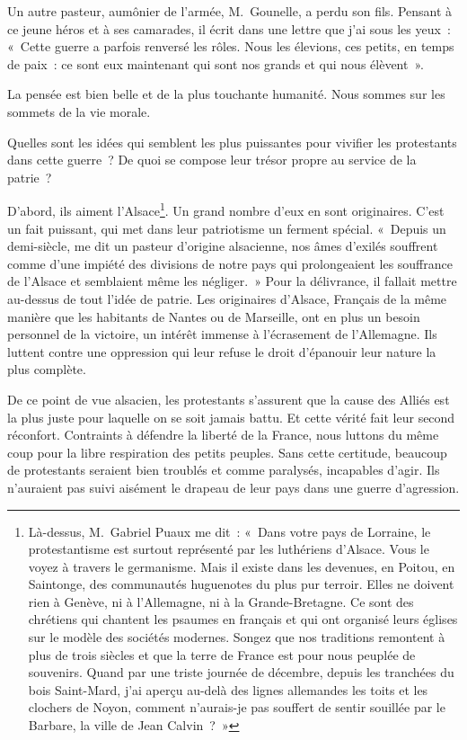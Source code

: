 \documentclass[french,twoside]{book} %
\begin{document}
Un autre pasteur, aumônier de l’armée, M. Gounelle, a perdu son fils. Pensant à ce jeune héros et à ses camarades, il écrit dans une lettre que j’ai sous les yeux : « Cette guerre a parfois renversé les rôles. Nous les élevions, ces petits, en temps de paix : ce sont eux maintenant qui sont nos grands et qui nous élèvent ».‌\par
La pensée est bien belle et de la plus touchante humanité. Nous sommes sur les sommets de la vie morale.‌\par
Quelles sont les idées qui semblent les plus puissantes pour vivifier les protestants dans cette guerre ? De quoi se compose leur trésor propre au service de la patrie ?‌\par
D’abord, ils aiment l’Alsace\footnote{ \par
 Là-dessus, M. Gabriel Puaux me dit : « Dans votre pays de Lorraine, le protestantisme est surtout représenté par les luthériens d’Alsace. Vous le voyez à travers le germanisme. Mais il existe dans les devenues, en Poitou, en Saintonge, des communautés huguenotes du plus pur terroir. Elles ne doivent rien à Genève, ni à l’Allemagne, ni à la Grande-Bretagne. Ce sont des chrétiens qui chantent les psaumes en français et qui ont organisé leurs églises sur le modèle des sociétés modernes. Songez que nos traditions remontent à plus de trois siècles et que la terre de France est pour nous peuplée de souvenirs. Quand par une triste journée de décembre, depuis les tranchées du bois Saint-Mard, j’ai aperçu au-delà des lignes allemandes les toits et les clochers de Noyon, comment n’aurais-je pas souffert de sentir souillée par le Barbare, la ville de Jean Calvin ? »
 }. Un grand nombre d’eux en sont originaires. C’est un fait puissant, qui met dans leur patriotisme un ferment spécial. « Depuis un demi-siècle, me dit un pasteur d’origine alsacienne, nos âmes d’exilés souffrent comme d’une impiété des divisions de notre pays qui prolongeaient les souffrance de l’Alsace et semblaient même les négliger. » Pour la délivrance, il fallait mettre au-dessus de tout l’idée de patrie. Les originaires d’Alsace, Français de la même manière que les habitants de Nantes ou de Marseille, ont en plus un besoin personnel de la victoire, un intérêt immense à l’écrasement de l’Allemagne. Ils luttent contre une oppression qui leur refuse le droit d’épanouir leur nature la plus complète.‌\par
De ce point de vue alsacien, les protestants s’assurent que la cause des Alliés est la plus juste pour laquelle on se soit jamais battu. Et cette vérité fait leur second réconfort. Contraints à défendre la liberté de la France, nous luttons du même coup pour la libre respiration des petits peuples. Sans cette certitude, beaucoup de protestants seraient bien troublés et comme paralysés, incapables d’agir. Ils n’auraient pas suivi aisément le drapeau de leur pays dans une guerre d’agression.‌\par
\end{document}
